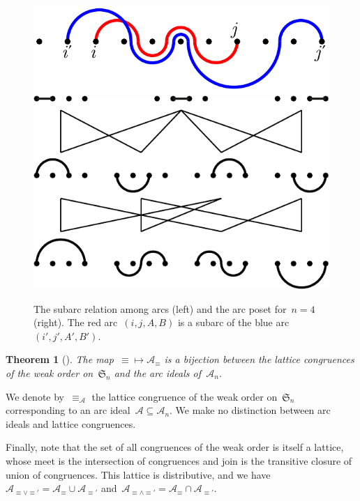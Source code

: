 \documentclass{amsart}
\newtheorem{theorem}{Theorem}[section]
\theoremstyle{definition}
\newcommand{\f}[1]{{\mathfrak{#1}}} %
\newcommand{\arcs}{{\mathcal{A}}} %
\newcommand{\meet}{\wedge} %
\newcommand{\join}{\vee} %
\begin{document}
\begin{figure}
	\capstart
	\centerline{\includegraphics[scale=.7,valign=c]{forcing} \hspace{1cm} \includegraphics[scale=.6,valign=c]{forcingOrder}}
	\caption{The subarc relation among arcs (left) and the arc poset for~$n = 4$ (right). The red arc~$(i,j,A,B)$ is a subarc of the blue arc~$(i',j',A',B')$. \mbox{\cite[Fig.~5]{PilaudSantos-quotientopes}}}
	\label{fig:forcingOrder}
\end{figure}

\begin{theorem}[{\cite[Thm.~4.4 \& Coro.~4.5]{Reading-arcDiagrams}}]
The map~${\equiv} \mapsto \arcs_\equiv$ is a bijection between the lattice congruences of the weak order on~$\f{S}_n$ and the arc ideals of~$\arcs_n$.
\end{theorem}

We denote by~$\equiv_\arcs$ the lattice congruence of the weak order on~$\f{S}_n$ corresponding to an arc ideal~$\arcs \subseteq \arcs_n$.
We make no distinction between arc ideals and lattice congruences.

Finally, note that the set of all congruences of the weak order is itself a lattice, whose meet is the intersection of congruences and join is the transitive closure of union of congruences.
This lattice is distributive, and we have~$\arcs_{{\equiv} \join {\equiv'}} = \arcs_\equiv \cup \arcs_{\equiv'}$ and~$\arcs_{{\equiv} \meet {\equiv'}} = \arcs_\equiv \cap \arcs_{\equiv'}$.
\end{document}
